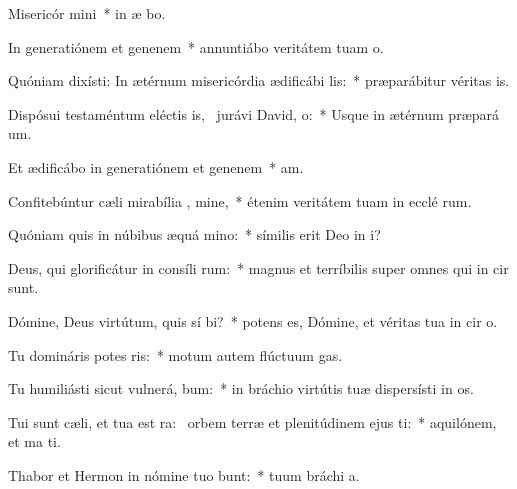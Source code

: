 \item Misericór mini~* in æ bo.
\item In generatiónem et genenem~* annuntiábo veritátem tuam   o.
\item Quóniam dixísti: In ætérnum misericórdia ædificábi  lis:~* præparábitur véritas   is.
\item Dispósui testaméntum eléctis is,~\pscross{} jurávi David,  o:~* Usque in ætérnum præpará  um.
\item Et ædificábo in generatiónem et genenem~*  am.
\item Confitebúntur cæli mirabília , mine,~* étenim veritátem tuam in ecclé rum.
\item Quóniam quis in núbibus æquá mino:~* símilis erit Deo in  i?
\item Deus, qui glorificátur in consíli rum:~* magnus et terríbilis super omnes qui in cir  sunt.
\item Dómine, Deus virtútum, quis sí bi?~* potens es, Dómine, et véritas tua in cir o.
\item Tu domináris potes ris:~* motum autem flúctuum   gas.
\item Tu humiliásti sicut vulnerá, bum:~* in bráchio virtútis tuæ dispersísti in os.
\item Tui sunt cæli, et tua est ra:~\pscross{} orbem terræ et plenitúdinem ejus  ti:~* aquilónem, et ma  ti.
\item Thabor et Hermon in nómine tuo bunt:~* tuum bráchi  a.
